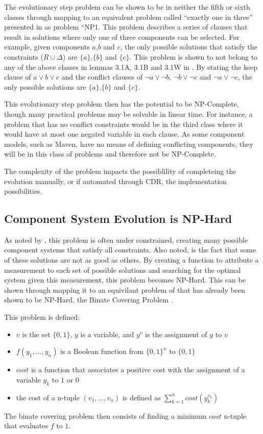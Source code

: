 The evolutionary step problem can be shown to be in neither the fifth or sixth classes 
through mapping to an equivalent problem called ``exactly one in three'' presented in \cite{Schaefer1978} as problem ``NP1.
This problem describes a series of clauses that result in solutions where only one of three components can be selected. 
For example, given components $a$,$b$ and $c$, the only possible solutions that satisfy the constraints ($R \cup \Delta$) are $\{a\}$,$\{b\}$ and $\{c\}$.
This problem is shown to not belong to any of the above classes in lemmas 3.1A, 3.1B and 3.1W in \cite{Schaefer1978}.
By stating the keep clause of $a \vee b \vee c$ and the conflict clauses of $\neg a \vee \neg b$, $\neg b \vee \neg c$ and $\neg a \vee \neg c$, 
the only possible solutions are $\{a\}$,$\{b\}$ and $\{c\}$. 

This evolutionary step problem then has the potential to be NP-Complete, though many practical problems may be solvable in linear time.
For instance, a problem that has no conflict constraints would be in the third class where it would have at most one negated variable in each clause.
As some component models, such as Maven, have no means of defining conflicting components, they will be in this class of problems and therefore not be NP-Complete. 

The complexity of the problem impacts the possiblility of completeing the evolution manually, or if automated through CDR, the implementation possibilities.

\subsection{Component System Evolution is NP-Hard}
As noted by \cite{leberre2008}, this problem is often under constrained, creating many possible component systems that satisfy all constraints.
Also noted, is the fact that some of these solutions are not as good as others.
By creating a function to attribute a measurement to each set of possible solutions and searching for the optimal system given this measurement, this problem becomes NP-Hard. 
This can be shown through mapping it to an equivilant problem of that has already been shown to be NP-Hard, the Binate Covering Problem \cite{Coudert1996}.

This problem is defined:
\begin{itemize}
  \item $v$ is the set $\{0,1\}$, $y$ is a variable, and $y^v$ is the assignment of $y$ to $v$
  \item $f(y_1, \ldots, y_n)$ is a Boolean function from $\{0,1\}^n$ to $\{0,1\}$
  \item $cost$ is a function that associates a positive cost with the assignment of a variable $y_k$ to $1$ or $0$
  \item the cost of a n-tuple $(v_1,\ldots,v_n)$ is defined as $\sum^n_{k=1}cost(y^{v_k}_{k})$
\end{itemize}
The binate covering problem then consists of finding a minimum $cost$ n-tuple that evaluates $f$ to $1$.


